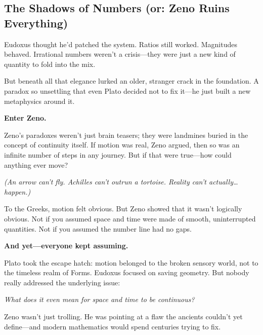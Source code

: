 \subsection{The Shadows of Numbers (or: Zeno Ruins Everything)}

Eudoxus thought he’d patched the system. Ratios still worked. Magnitudes behaved. Irrational numbers weren’t a crisis—they were just a new kind of quantity to fold into the mix.

But beneath all that elegance lurked an older, stranger crack in the foundation. A paradox so unsettling that even Plato decided not to fix it—he just built a new metaphysics around it.

\textbf{Enter Zeno.}

Zeno’s paradoxes weren’t just brain teasers; they were landmines buried in the concept of continuity itself. If motion was real, Zeno argued, then so was an infinite number of steps in any journey. But if that were true—how could anything ever move?

\textit{(An arrow can’t fly. Achilles can’t outrun a tortoise. Reality can’t actually… happen.)}

\vspace{0.5em}
To the Greeks, motion felt obvious. But Zeno showed that it wasn’t logically obvious. Not if you assumed space and time were made of smooth, uninterrupted quantities.  
Not if you assumed the number line had no gaps.  

\textbf{And yet—everyone kept assuming.}  

Plato took the escape hatch: motion belonged to the broken sensory world, not to the timeless realm of Forms. Eudoxus focused on saving geometry. But nobody really addressed the underlying issue:  

\textit{What does it even mean for space and time to be continuous?}  

Zeno wasn’t just trolling. He was pointing at a flaw the ancients couldn’t yet define—and modern mathematics would spend centuries trying to fix.

